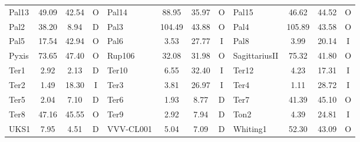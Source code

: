 \begin{table}
\begin{tabular}{l | c | c | c | l | c | c | c | l | c | c | c}
                    Pal13 &  49.09 &  42.54 &              O &
                    Pal14 &  88.95 &  35.97 &              O &
                    Pal15 &  46.62 &  44.52 &              O \\
                    Pal2 &  38.20 &   8.94 &              D &
                    Pal3 & 104.49 &  43.88 &              O &
                    Pal4 & 105.89 &  43.58 &              O \\
                    Pal5 &  17.54 &  42.94 &              O &
                    Pal6 &   3.53 &  27.77 &              I &
                    Pal8 &   3.99 &  20.14 &              I \\
                    Pyxis &  73.65 &  47.40 &              O &
                Rup106 &  32.08 &  31.98 &              O &
            SagittariusII &  75.32 &  41.80 &              O \\
                    Ter1 &   2.92 &   2.13 &              D &
                    Ter10 &   6.55 &  32.40 &              I &
                    Ter12 &   4.23 &  17.31 &              I \\
                    Ter2 &   1.49 &  18.30 &              I &
                    Ter3 &   3.81 &  26.97 &              I &
                    Ter4 &   1.11 &  28.72 &              I \\
                    Ter5 &   2.04 &   7.10 &              D &
                    Ter6 &   1.93 &   8.77 &              D &
                    Ter7 &  41.39 &  45.10 &              O \\
                    Ter8 &  47.16 &  45.55 &              O &
                    Ter9 &   2.92 &   7.94 &              D &
                    Ton2 &   4.39 &  24.81 &              I \\
                    UKS1 &   7.95 &   4.51 &              D &
                VVV-CL001 &   5.04 &   7.09 &              D &
                Whiting1 &  52.30 &  43.09 &              O \\               
            \hline
            \end{tabular}
        \end{table}

